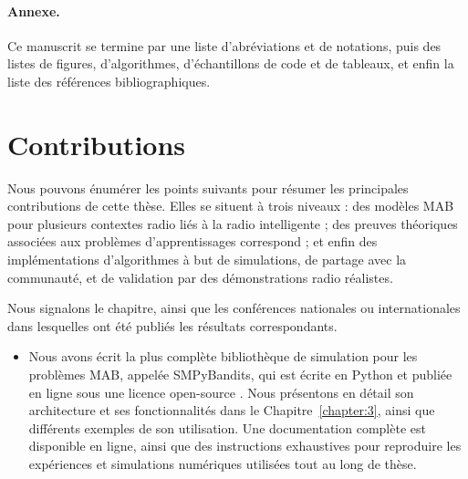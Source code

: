 \begin{resume_fr}
\paragraph{Annexe.}
%
Ce manuscrit se termine par
une liste d'abréviations et de notations, puis des listes de figures, d'algorithmes, d'échantillons de code et de tableaux,
et enfin la liste des références bibliographiques.




\section*{Contributions}

Nous pouvons énumérer les points suivants pour résumer les principales contributions de cette thèse.
Elles se situent à trois niveaux : des modèles MAB pour plusieurs contextes radio liés à la radio intelligente ; des preuves théoriques associées aux problèmes d'apprentissages correspond ; et enfin des implémentations d'algorithmes à but de simulations, de partage avec la communauté, et de validation par des démonstrations radio réalistes.

Nous signalons le chapitre, ainsi que les conférences nationales ou internationales dans lesquelles ont été publiés les résultats correspondants.

\begin{itemize}


    \item
    Nous avons écrit la plus complète bibliothèque de simulation pour les problèmes MAB, appelée SMPyBandits, qui est écrite en Python et publiée en ligne sous une licence open-source \cite{SMPyBanditsJMLR,SMPyBandits}.
    Nous présentons en détail son architecture et ses fonctionnalités dans le Chapitre~\ref{chapter:3}, ainsi que différents exemples de son utilisation.
    Une documentation complète est disponible en ligne, ainsi que des instructions exhaustives pour reproduire les expériences et simulations numériques utilisées tout au long de thèse.


\end{itemize}
\end{resume_fr}
